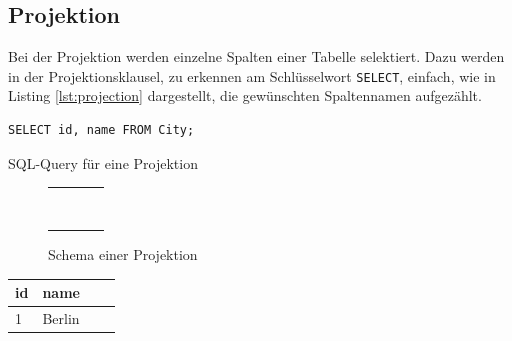 \documentclass[a4paper]{article}
\begin{document}
\newpage
\subsection{Projektion}
Bei der Projektion werden einzelne Spalten einer Tabelle selektiert. Dazu werden in der Projektionsklausel, zu erkennen am Schlüsselwort \texttt{SELECT}, einfach, wie in Listing \ref{lst:projection} dargestellt, die gewünschten Spaltennamen aufgezählt.

\begin{listing}[H]
\begin{verbatim}
SELECT id, name FROM City;
\end{verbatim}
\caption{SQL-Query für eine Projektion}
\label{lst:projection}
\end{listing}

\begin{minipage}{\textwidth}
\begin{minipage}[b]{0.49\textwidth}
\begin{figure}[H]
\centering
  \begin{tabular}{| c | c | c | c |}
    \hline
     \cellcolor{cell} & \cellcolor{cell} & & \\ \hline
     \cellcolor{cell} & \cellcolor{cell} & & \\ \hline
     \cellcolor{cell} & \cellcolor{cell} & & \\ \hline
     \cellcolor{cell} & \cellcolor{cell} & & \\ \hline
     \cellcolor{cell} & \cellcolor{cell} & & \\ \hline
     \cellcolor{cell} & \cellcolor{cell} & & \\ \hline
     \cellcolor{cell} & \cellcolor{cell} & & \\ \hline
     \cellcolor{cell} & \cellcolor{cell} & & \\ \hline
     \cellcolor{cell} & \cellcolor{cell} & & \\ \hline
  \end{tabular}
\caption{Schema einer Projektion}
\label{fig:projection}
\end{figure}
\end{minipage}
\hfill
\begin{minipage}[b]{0.49\textwidth}
\begin{table}[H]
\centering
  \begin{tabular}{| l | l | l | l |}
    \hline
    id & name \\ \hline
    \hline
   1 & Berlin \\ \hline

\end{tabular}
\end{table}
\end{minipage}
\end{minipage}
\end{document}
